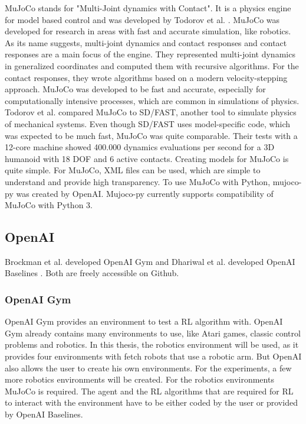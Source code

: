 MuJoCo stands for "Multi-Joint dynamics with Contact". It is a physics engine for model based control and was developed by Todorov et al. \cite{mujoco}.
MuJoCo was developed for research in areas with fast and accurate simulation, like robotics. As its name suggests, multi-joint dynamics and contact responses and contact responses are a main focus of the engine. They represented multi-joint dynamics in generalized coordinates and computed them with recursive algorithms. For the contact responses, they wrote algorithms based on a modern velocity-stepping approach. MuJoCo was developed to be fast and accurate, especially for computationally intensive processes, which are common in simulations of physics. 
\newline
Todorov et al. compared MuJoCo to SD/FAST, another tool to simulate physics of mechanical systems. Even though SD/FAST uses model-specific code, which was expected to be much fast, MuJoCo was quite comparable. Their tests with a 12-core machine showed 400.000 dynamics evaluations per second for a 3D humanoid with 18 DOF and 6 active contacts. 
Creating models for MuJoCo is quite simple. For MuJoCo, XML files can be used, which are simple to understand and provide high transparency. 
\newline
To use MuJoCo with Python, mujoco-py was created by OpenAI. Mujoco-py currently supports compatibility of MuJoCo with Python 3.

\subsection{OpenAI}
Brockman et al. developed OpenAI Gym \cite{gym} and Dhariwal et al. developed OpenAI Baselines \cite{baselines}. Both are freely accessible on Github.

\subsubsection{OpenAI Gym}
OpenAI Gym provides an environment to test a RL algorithm with. OpenAI Gym already contains many environments to use, like Atari games, classic control problems and robotics. In this thesis, the robotics environment will be used, as it provides four environments with fetch robots that use a robotic arm. But OpenAI also allows the user to create his own environments. For the experiments, a few more robotics environments will be created. For the robotics environments MuJoCo is required. 
The agent and the RL algorithms that are required for RL to interact with the environment have to be either coded by the user or provided by OpenAI Baselines.

